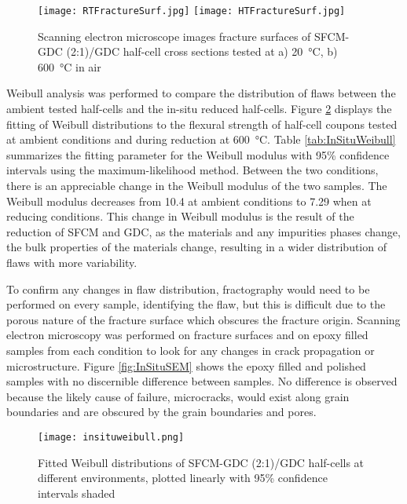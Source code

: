         \begin{figure}
          \texttt{[image: RTFractureSurf.jpg]}
          \texttt{[image: HTFractureSurf.jpg]}
          \caption{Scanning electron microscope images fracture surfaces of SFCM-GDC (2:1)/GDC half-cell cross sections tested at a) \SI{20}{\celsius}, b) \SI{600}{\celsius} in air}
          \label{fig:FracSurf}
        \end{figure}

        Weibull analysis was performed to compare the distribution of flaws between the ambient tested half-cells and the in-situ reduced half-cells.
        Figure \ref{fig:halfcellweibull} displays the fitting of Weibull distributions to the flexural strength of half-cell coupons tested at ambient conditions and during reduction at \SI{600}{\celsius}.
        Table \ref{tab:InSituWeibull} summarizes the fitting parameter for the Weibull modulus with 95\% confidence intervals using the maximum-likelihood method.
        Between the two conditions, there is an appreciable change in the Weibull modulus of the two samples.
        The Weibull modulus decreases from 10.4 at ambient conditions to 7.29 when at reducing conditions.
        This change in Weibull modulus is the result of the reduction of SFCM and GDC, as the materials and any impurities phases change, the bulk properties of the materials change, resulting in a wider distribution of flaws with more variability.

        To confirm any changes in flaw distribution, fractography would need to be performed on every sample, identifying the flaw, but this is difficult due to the porous nature of the fracture surface which obscures the fracture origin.
        Scanning electron microscopy was performed on fracture surfaces and on epoxy filled samples from each condition to look for any changes in crack propagation or microstructure.
        Figure \ref{fig:InSituSEM} shows the epoxy filled and polished samples with no discernible difference between samples.
        No difference is observed because the likely cause of failure, microcracks, would exist along grain boundaries and are obscured by the grain boundaries and pores.\cite{Danzer2008,Yu2007}

        \begin{figure}
          \texttt{[image: insituweibull.png]}
          \caption{Fitted Weibull distributions of SFCM-GDC (2:1)/GDC half-cells at different environments, plotted linearly with 95\% confidence intervals shaded}
          \label{fig:halfcellweibull}
        \end{figure}

